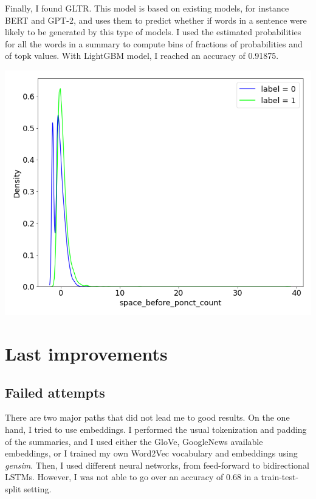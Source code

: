 \documentclass{article}
\newenvironment{Figure}
  {\par\medskip\noindent\minipage{\linewidth}}
  {\endminipage\par\medskip}
\begin{document}
\begin{multicols}{2}
Finally, I found GLTR\cite{gltr}. This model is based on existing models, for instance BERT and GPT-2, and uses them to predict whether if words in a sentence were likely to be generated by this type of models. I used the estimated probabilities for all the words in a summary to compute bins of fractions of probabilities and of topk values. With LightGBM model, I reached an accuracy of 0.91875.

\begin{Figure}
  \centering
  \captionsetup{type=figure}
  \includegraphics[width=0.75\linewidth]{figures/space_before_ponct_count_repart.png}
  \label{fig:spacbef}
\end{Figure}

\section{Last improvements}

\subsection{Failed attempts}

There are two major paths that did not lead me to good results. On the one hand, I tried to use embeddings. I performed the usual tokenization and padding of the summaries, and I used either the GloVe\cite{glove}, GoogleNews\cite{word2vec} available embeddings, or I trained my own Word2Vec vocabulary and embeddings using \textit{gensim}. Then, I used different neural networks, from feed-forward to bidirectional LSTMs. However, I was not able to go over an accuracy of 0.68 in a train-test-split setting. 


\end{multicols}
\end{document}
